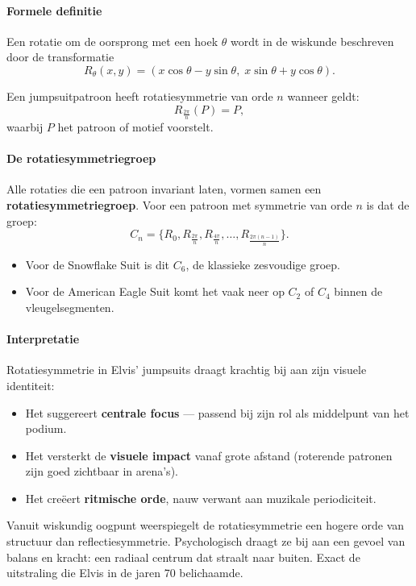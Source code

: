 \documentclass{book}
\begin{document}
\paragraph{Formele definitie}

Een rotatie om de oorsprong met een hoek $\theta$ wordt in de wiskunde beschreven door de transformatie
\[
R_\theta(x,y) = 
\left(
x\cos\theta - y\sin\theta,\;
x\sin\theta + y\cos\theta
\right).
\]

Een jumpsuitpatroon heeft rotatiesymmetrie van orde $n$ wanneer geldt:
\[
R_{\frac{2\pi}{n}}(P) = P,
\]
waarbij $P$ het patroon of motief voorstelt.

\paragraph{De rotatiesymmetriegroep}

Alle rotaties die een patroon invariant laten, vormen samen een \textbf{rotatiesymmetriegroep}.  
Voor een patroon met symmetrie van orde $n$ is dat de groep:
\[
C_n = \{ R_0, R_{\frac{2\pi}{n}}, R_{\frac{4\pi}{n}}, \ldots, R_{\frac{2\pi(n-1)}{n}} \}.
\]

\begin{itemize}
	\item Voor de Snowflake Suit is dit $C_6$, de klassieke zesvoudige groep.
	\item Voor de American Eagle Suit komt het vaak neer op $C_2$ of $C_4$ binnen de vleugelsegmenten.
\end{itemize}

\paragraph{Interpretatie}

Rotatiesymmetrie in Elvis' jumpsuits draagt krachtig bij aan zijn visuele identiteit:

\begin{itemize}
	\item Het suggereert \textbf{centrale focus} --- passend bij zijn rol als middelpunt van het podium.
	\item Het versterkt de \textbf{visuele impact} vanaf grote afstand (roterende patronen zijn goed zichtbaar in arena's).
	\item Het cre\"eert \textbf{ritmische orde}, nauw verwant aan muzikale periodiciteit.
\end{itemize}

Vanuit wiskundig oogpunt weerspiegelt de rotatiesymmetrie een hogere orde van structuur dan reflectiesymmetrie.  
Psychologisch draagt ze bij aan een gevoel van balans en kracht: een radiaal centrum dat straalt naar buiten.  
Exact de uitstraling die Elvis in de jaren 70 belichaamde.
\end{document}
